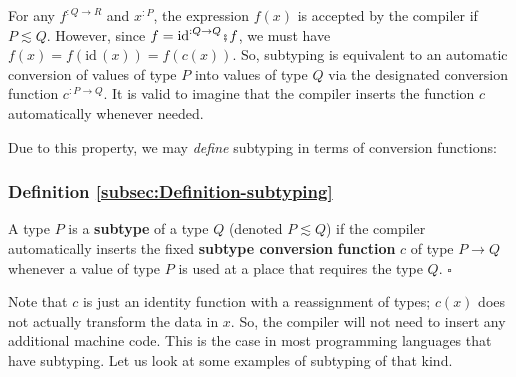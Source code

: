 For any $f^{:Q\rightarrow R}$ and $x^{:P}$, the expression $f(x)$
is accepted by the compiler if $P\lesssim Q$. However, since $f=\text{id}^{:Q\rightarrow Q}\bef f$,
we must have $f(x)=f(\text{id}\,(x))=f(c(x))$. So, subtyping is equivalent
to an automatic conversion of values of type $P$ into values of type
$Q$ via the designated conversion function $c^{:P\rightarrow Q}$.
It is valid to imagine that the compiler inserts the function $c$
automatically whenever needed.

Due to this property, we may \emph{define} subtyping in terms of conversion
functions:

\subsubsection{Definition \label{subsec:Definition-subtyping}\ref{subsec:Definition-subtyping} }

A type $P$ is a \textbf{subtype}
of a type $Q$ (denoted $P\lesssim Q$) if the compiler automatically
inserts the fixed 
\textbf{subtype conversion} \textbf{function} $c$ of type $P\rightarrow Q$
whenever a value of type $P$ is used at a place that requires the
type $Q$. $\square$

Note that $c$ is just an identity function with a reassignment of
types; $c(x)$ does not actually transform the data in $x$. So, the
compiler will not need to insert any additional machine code. This
is the case in most programming languages that have subtyping. Let
us look at some examples of subtyping of that kind. 

